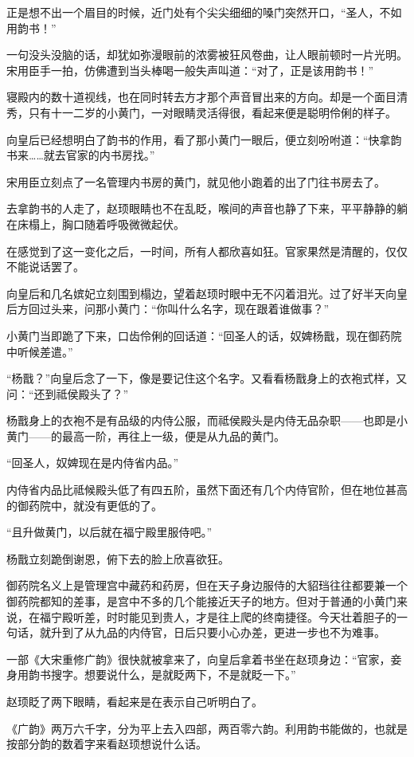 正是想不出一个眉目的时候，近门处有个尖尖细细的嗓门突然开口，“圣人，不如用韵书！”

一句没头没脑的话，却犹如弥漫眼前的浓雾被狂风卷曲，让人眼前顿时一片光明。宋用臣手一拍，仿佛遭到当头棒喝一般失声叫道：“对了，正是该用韵书！”

寝殿内的数十道视线，也在同时转去方才那个声音冒出来的方向。却是一个面目清秀，只有十一二岁的小黄门，一对眼睛灵活得很，看起来便是聪明伶俐的样子。

向皇后已经想明白了韵书的作用，看了那小黄门一眼后，便立刻吩咐道：“快拿韵书来……就去官家的内书房找。”

宋用臣立刻点了一名管理内书房的黄门，就见他小跑着的出了门往书房去了。

去拿韵书的人走了，赵顼眼睛也不在乱眨，喉间的声音也静了下来，平平静静的躺在床榻上，胸口随着呼吸微微起伏。

在感觉到了这一变化之后，一时间，所有人都欣喜如狂。官家果然是清醒的，仅仅不能说话罢了。

向皇后和几名嫔妃立刻围到榻边，望着赵顼时眼中无不闪着泪光。过了好半天向皇后方回过头来，问那小黄门：“你叫什么名字，现在跟着谁做事？”

小黄门当即跪了下来，口齿伶俐的回话道：“回圣人的话，奴婢杨戬，现在御药院中听候差遣。”

“杨戬？”向皇后念了一下，像是要记住这个名字。又看看杨戬身上的衣袍式样，又问：“还到祗侯殿头了？”

杨戬身上的衣袍不是有品级的内侍公服，而祗侯殿头是内侍无品杂职——也即是小黄门——的最高一阶，再往上一级，便是从九品的黄门。

“回圣人，奴婢现在是内侍省内品。”

内侍省内品比祗候殿头低了有四五阶，虽然下面还有几个内侍官阶，但在地位甚高的御药院中，就没有更低的了。

“且升做黄门，以后就在福宁殿里服侍吧。”

杨戬立刻跪倒谢恩，俯下去的脸上欣喜欲狂。

御药院名义上是管理宫中藏药和药房，但在天子身边服侍的大貂珰往往都要兼一个御药院都知的差事，是宫中不多的几个能接近天子的地方。但对于普通的小黄门来说，在福宁殿听差，时时能见到贵人，才是往上爬的终南捷径。今天壮着胆子的一句话，就升到了从九品的内侍官，日后只要小心办差，更进一步也不为难事。

一部《大宋重修广韵》很快就被拿来了，向皇后拿着书坐在赵顼身边：“官家，妾身用韵书搜字。想要说什么，是就眨两下，不是就眨一下。”

赵顼眨了两下眼睛，看起来是在表示自己听明白了。

《广韵》两万六千字，分为平上去入四部，两百零六韵。利用韵书能做的，也就是按部分韵的数着字来看赵顼想说什么话。

